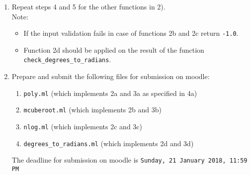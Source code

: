 \documentclass{article}
\begin{document}
\begin{enumerate}
\item Repeat steps 4 and 5 for the other functions in 2).\\
	  Note: 
	  \begin{itemize}
	  \item If the input validation fails in case of functions 2b and 2c return {\tt -1.0}.
	  \item Function 2d should be applied on the result of the function {\tt check\_degrees\_to\_radians}.
	  \end{itemize}
\item Prepare and submit the following files for submission on moodle:

	\begin{enumerate}
		\item {\tt poly.ml} (which implements 2a and 3a as specified in 4a)
		\item {\tt mcuberoot.ml} (which implements 2b and 3b)
		\item {\tt nlog.ml} (which implements 2c and 3c)
		\item {\tt degrees\_to\_radians.ml} (which implements 2d and 3d)
	\end{enumerate}
	The deadline for submission on moodle is {\tt Sunday, 21 January 2018, 11:59 PM}

\end{enumerate}
\end{document}
